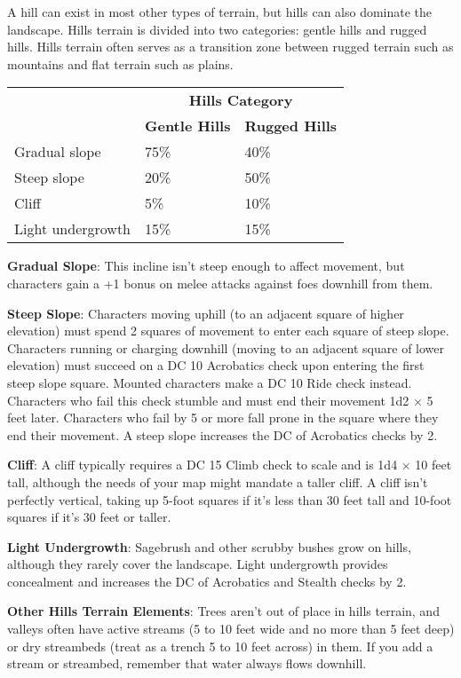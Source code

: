 				
A hill can exist in most other types of terrain, but hills can also dominate the landscape. Hills terrain is divided into two categories: gentle hills and rugged hills. Hills terrain often serves as a transition zone between rugged terrain such as mountains and flat terrain such as plains.
\begin{tabular}{lll}
 & \multicolumn{2}{c}{\textbf{Hills Category}}\\
 & \textbf{Gentle Hills} & \textbf{Rugged Hills}\\
Gradual slope & 75\% & 40\%\\
Steep slope & 20\% & 50\%\\
Cliff & 5\% & 10\%\\
Light undergrowth & 15\% & 15\%\\
\end{tabular}

				
\textbf{Gradual Slope}: This incline isn't steep enough to affect movement, but characters gain a +1 bonus on melee attacks against foes downhill from them.
				
\textbf{Steep Slope}: Characters moving uphill (to an adjacent square of higher elevation) must spend 2 squares of movement to enter each square of steep slope. Characters running or charging downhill (moving to an adjacent square of lower elevation) must succeed on a DC 10 Acrobatics check upon entering the first steep slope square. Mounted characters make a DC 10 Ride check instead. Characters who fail this check stumble and must end their movement 1d2 \mbox{$\times$} 5 feet later. Characters who fail by 5 or more fall prone in the square where they end their movement. A steep slope increases the DC of Acrobatics checks by 2.
				
\textbf{Cliff}: A cliff typically requires a DC 15 Climb check to scale and is 1d4 \mbox{$\times$} 10 feet tall, although the needs of your map might mandate a taller cliff. A cliff isn't perfectly vertical, taking up 5-foot squares if it's less than 30 feet tall and 10-foot squares if it's 30 feet or taller. 
				
\textbf{Light Undergrowth}: Sagebrush and other scrubby bushes grow on hills, although they rarely cover the landscape. Light undergrowth provides concealment and increases the DC of Acrobatics and Stealth checks by 2. 
				
\textbf{Other Hills Terrain Elements}: Trees aren't out of place in hills terrain, and valleys often have active streams (5 to 10 feet wide and no more than 5 feet deep) or dry streambeds (treat as a trench 5 to 10 feet across) in them. If you add a stream or streambed, remember that water always flows downhill.
				
